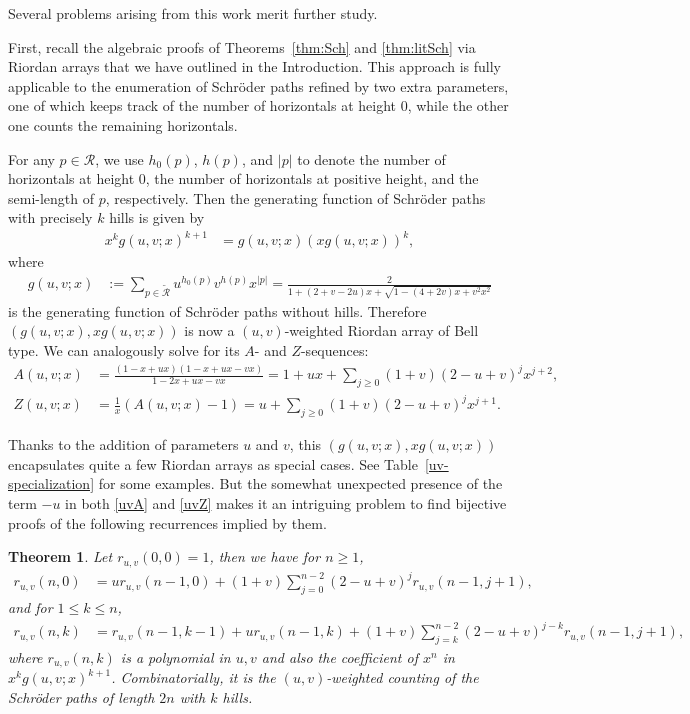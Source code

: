 \documentclass[11pt,reqno]{amsart}
\numberwithin{equation}{section}
\theoremstyle{plain}
\newtheorem{theorem}{Theorem}[section]
\theoremstyle{definition}
\newcommand{\R}{\mathcal{R}}
\begin{document}
Several problems arising from this work merit further study.

First, recall the algebraic proofs of Theorems~\ref{thm:Sch} and \ref{thm:litSch} via Riordan arrays that we have outlined in the Introduction. This approach is fully applicable to the enumeration of Schr\"oder paths refined by two extra parameters, one of which keeps track of the number of horizontals at height $0$, while the other one counts the remaining horizontals.

For any $p\in\R$, we use $h_0(p)$, $h(p)$, and $|p|$ to denote the number of horizontals at height $0$, the number of horizontals at positive height, and the semi-length of $p$, respectively. Then the generating function of Schr\"oder paths with precisely $k$ hills is given by
\begin{align*}
x^kg(u,v;x)^{k+1} &=g(u,v;x) (xg(u,v;x))^k,
\end{align*}
where
\begin{align*}
g(u,v;x) &:=\sum_{p\in\widetilde{\R}}u^{h_0(p)}v^{h(p)}x^{|p|}=\frac{2}{1+(2+v-2u)x+\sqrt{1-(4+2v)x+v^2x^2}}
\end{align*}
is the generating function of Schr\"oder paths without hills. Therefore $(g(u,v;x),xg(u,v;x))$ is now a $(u,v)$-weighted Riordan array of Bell type. We can analogously solve for its $A$- and $Z$-sequences:
\begin{align}
A(u,v;x) &= \frac{(1-x+ux)(1-x+ux-vx)}{1-2x+ux-vx}=1+ux+\sum_{j\ge 0}(1+v)(2-u+v)^jx^{j+2},\label{uvA}\\
Z(u,v;x) &= \frac{1}{x}(A(u,v;x)-1)=u+\sum_{j\ge 0}(1+v)(2-u+v)^jx^{j+1}.\label{uvZ}
\end{align}

Thanks to the addition of parameters $u$ and $v$, this $(g(u,v;x),xg(u,v;x))$ encapsulates quite a few Riordan arrays as special cases. See Table~\ref{uv-specialization} for some examples. But the somewhat unexpected presence of the term $-u$ in both \eqref{uvA} and \eqref{uvZ} makes it an intriguing problem to find bijective proofs of the following recurrences implied by them. 
\begin{theorem}
Let $r_{u,v}(0,0)=1$, then we have for $n\ge 1$,
\begin{align}
r_{u,v}(n,0)&=ur_{u,v}(n-1,0)+(1+v)\sum\limits_{j=0}^{n-2}(2-u+v)^{j}r_{u,v}(n-1,j+1),\label{uvZ-rec}
\end{align}
and for $1\le k\le n$,
\begin{align}
r_{u,v}(n,k)&=r_{u,v}(n-1,k-1)+ur_{u,v}(n-1,k)+(1+v)\sum\limits_{j=k}^{n-2}(2-u+v)^{j-k}r_{u,v}(n-1,j+1),\label{uvA-rec}
\end{align}
where $r_{u,v}(n,k)$ is a polynomial in $u,v$ and also the coefficient of $x^n$ in $x^kg(u,v;x)^{k+1}$. Combinatorially, it is the $(u,v)$-weighted counting of the Schr\"oder paths of length $2n$ with $k$ hills.
\end{theorem}
\end{document}
